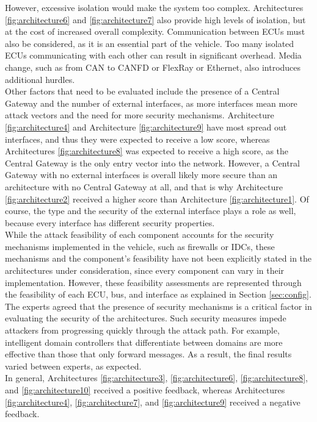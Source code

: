 However, excessive isolation would make the system too complex. 
Architectures \ref{fig:architecture6} and \ref{fig:architecture7} also provide high levels of isolation, but at the cost of increased overall complexity.
Communication between ECUs must also be considered, as it is an essential part of the vehicle. 
Too many isolated ECUs communicating with each other can result in significant overhead. 
Media change, such as from CAN to CANFD or FlexRay or Ethernet, also introduces additional hurdles.\\

Other factors that need to be evaluated include the presence of a Central Gateway and the number of external interfaces, 
as more interfaces mean more attack vectors and the need for more security mechanisms.
Architecture \ref{fig:architecture4} and Architecture \ref{fig:architecture9} have most spread out interfaces, and thus they were expected to receive a low score,
whereas Architectures \ref{fig:architecture8} was expected to receive a high score, as the Central Gateway is the only entry vector into the network.
However, a Central Gateway with no external interfaces is overall likely more secure than an architecture with no Central Gateway at all, and that is why 
Architecture \ref{fig:architecture2} received a higher score than Architecture \ref{fig:architecture1}. 
Of course, the type and the security of the external interface plays a role as well, because every interface has different security properties.\\

While the attack feasibility of each component accounts for the security mechanisms implemented in the vehicle, such as firewalls or IDCs, 
these mechanisms and the component's feasibility have not been explicitly stated in the architectures under consideration, since every component can vary in their implementation.
However, these feasibility assessments are represented through the feasibility of each ECU, bus, and interface as explained in Section \ref{sec:config}.
The experts agreed that the presence of security mechanisms is a critical factor in evaluating the security of the architectures.
Such security measures impede attackers from progressing quickly through the attack path. 
For example, intelligent domain controllers that differentiate between domains are more effective than those that only forward messages.
As a result, the final results varied between experts, as expected.\\

In general, Architectures \ref{fig:architecture3}, \ref{fig:architecture6}, \ref{fig:architecture8}, and \ref{fig:architecture10} received a positive feedback,
whereas Architectures \ref{fig:architecture4}, \ref{fig:architecture7}, and \ref{fig:architecture9} received a negative feedback.

